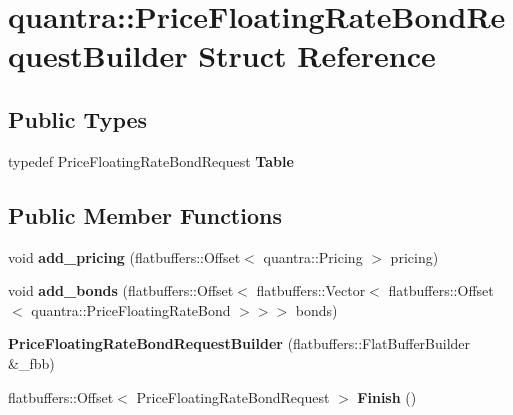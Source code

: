 \hypertarget{structquantra_1_1PriceFloatingRateBondRequestBuilder}{}\section{quantra\+:\+:Price\+Floating\+Rate\+Bond\+Request\+Builder Struct Reference}
\label{structquantra_1_1PriceFloatingRateBondRequestBuilder}
\subsection*{Public Types}
\begin{DoxyCompactItemize}
\item 
\mbox{\label{structquantra_1_1PriceFloatingRateBondRequestBuilder_a9e432afa9abadc9781de8542b831eb43}} 
typedef Price\+Floating\+Rate\+Bond\+Request {\bfseries Table}
\end{DoxyCompactItemize}
\subsection*{Public Member Functions}
\begin{DoxyCompactItemize}
\item 
\mbox{\label{structquantra_1_1PriceFloatingRateBondRequestBuilder_a66f1c6ae10e5b5a483f8926fbf6d778e}} 
void {\bfseries add\+\_\+pricing} (flatbuffers\+::\+Offset$<$ quantra\+::\+Pricing $>$ pricing)
\item 
\mbox{\label{structquantra_1_1PriceFloatingRateBondRequestBuilder_a43ea44632f87e8bd8e3d0cf3d76c8660}} 
void {\bfseries add\+\_\+bonds} (flatbuffers\+::\+Offset$<$ flatbuffers\+::\+Vector$<$ flatbuffers\+::\+Offset$<$ quantra\+::\+Price\+Floating\+Rate\+Bond $>$$>$$>$ bonds)
\item 
\mbox{\label{structquantra_1_1PriceFloatingRateBondRequestBuilder_a09b5ffc849952f6c8d91f3b93313391c}} 
{\bfseries Price\+Floating\+Rate\+Bond\+Request\+Builder} (flatbuffers\+::\+Flat\+Buffer\+Builder \&\+\_\+fbb)
\item 
\mbox{\label{structquantra_1_1PriceFloatingRateBondRequestBuilder_a27034d808d97d3711eee48e69407f723}} 
flatbuffers\+::\+Offset$<$ Price\+Floating\+Rate\+Bond\+Request $>$ {\bfseries Finish} ()
\end{DoxyCompactItemize}
